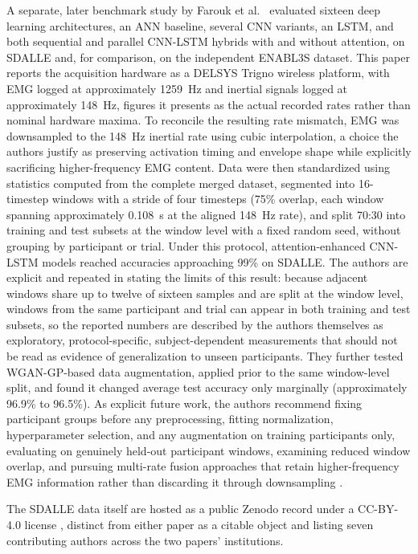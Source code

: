 \documentclass[conference]{IEEEtran}
\begin{document}
A separate, later benchmark study by Farouk et
al.~\cite{farouk2026sdalle} evaluated sixteen deep learning
architectures, an ANN baseline, several CNN variants, an LSTM, and
both sequential and parallel CNN-LSTM hybrids with and without
attention, on SDALLE and, for comparison, on the independent ENABL3S
dataset. This paper reports the acquisition hardware as a DELSYS
Trigno wireless platform, with EMG logged at approximately 1259~Hz
and inertial signals logged at approximately 148~Hz, figures it
presents as the actual recorded rates rather than nominal hardware
maxima. To reconcile the resulting rate mismatch, EMG was
downsampled to the 148~Hz inertial rate using cubic interpolation,
a choice the authors justify as preserving activation timing and
envelope shape while explicitly sacrificing higher-frequency EMG
content. Data were then standardized using statistics computed from
the complete merged dataset, segmented into 16-timestep windows with
a stride of four timesteps (75\% overlap, each window spanning
approximately 0.108~s at the aligned 148~Hz rate), and split 70:30
into training and test subsets at the window level with a fixed
random seed, without grouping by participant or trial. Under this
protocol, attention-enhanced CNN-LSTM models reached accuracies
approaching 99\% on SDALLE. The authors are explicit and repeated in
stating the limits of this result: because adjacent windows share up
to twelve of sixteen samples and are split at the window level,
windows from the same participant and trial can appear in both
training and test subsets, so the reported numbers are described by
the authors themselves as exploratory, protocol-specific,
subject-dependent measurements that should not be read as evidence
of generalization to unseen participants. They further tested
WGAN-GP-based data augmentation, applied prior to the same
window-level split, and found it changed average test accuracy only
marginally (approximately 96.9\% to 96.5\%). As explicit future
work, the authors recommend fixing participant groups before any
preprocessing, fitting normalization, hyperparameter selection, and
any augmentation on training participants only, evaluating on
genuinely held-out participant windows, examining reduced window
overlap, and pursuing multi-rate fusion approaches that retain
higher-frequency EMG information rather than discarding it through
downsampling \cite{farouk2026sdalle}.

The SDALLE data itself are hosted as a public Zenodo record under a
CC-BY-4.0 license \cite{sdalle2025zenodo}, distinct from either
paper as a citable object and listing seven contributing authors
across the two papers' institutions.
\end{document}

